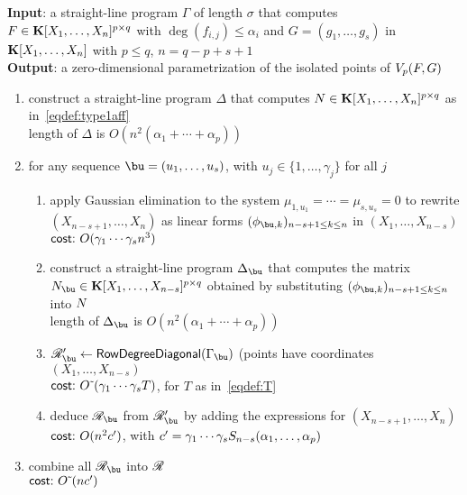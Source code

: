 \documentclass[12pt]{article}
\begin{document}
\begin{algorithm}[!t]
\caption{$\mathsf{RowDegree}(\Gamma)$}
{\bf Input}:  a straight-line program $\Gamma$ of length $\sigma$ that computes
 $F \in \mathbf{K}[X_1, \ldots, X_n]^{p \times q}$ with $\deg(f_{i,j}) \leq \alpha_i$
and $G = (g_1, \ldots, g_s)$ in $\mathbf{K}[X_1, \ldots, X_n]$ with $p \leq q$, $n = q-p+s+1$\\
{\bf Output}: a zero-dimensional parametrization of the isolated points of $V_{p}({F},G)$
\begin{enumerate}
\item construct a straight-line program $\Delta$ that computes ${N} \in \mathbf{K}[X_1,\dots,X_n]^{p \times q}$ as in~\eqref{eqdef:type1aff}\\
length of $\Delta$ is $O(n^2(\alpha_1+\cdots+\alpha_p))$
\item for any sequence $\bu=(u_1,\dots,u_s)$, with $u_j \in \{1,\dots,\gamma_j\}$ for all $j$
\begin{enumerate}
\item apply Gaussian elimination to the system $\mu_{1,u_1}=\cdots=\mu_{s,u_s}=0$
  to rewrite $(X_{n-s+1}, \ldots, X_n)$ as linear forms $(\phi_{\bu,k})_{n-s+1 \le k \le n}$ in $(X_1,\dots,X_{n-s})$\\
  $\text{\sf{cost:~}} O(\gamma_1 \cdots \gamma_s n^3)$

\item construct a straight-line program $\Delta_{\bu}$ that computes the matrix 
  $\mN_\bu  \in \KK[X_1, \dots, X_{n-s}]^{p \times q}$ obtained
  by substituting $(\phi_{\bu,k})_{n-s+1 \le k \le n}$ into ${N}$ \\
  length of $\Delta_{\bu}$ is $O(n^2(\alpha_1+\cdots+\alpha_p))$

\item $\scrR'_\bu \gets \mathsf{RowDegreeDiagonal}(\Gamma_\bu)$ (points have coordinates $(X_1,\dots,X_{n-s})$\\
  $\text{\sf{cost:~}} {O}{\,\tilde{ }\,}(\gamma_1 \cdots \gamma_s T)$, for $T$ as in~\eqref{eqdef:T}

\item deduce $\scrR_\bu$ from $\scrR'_\bu$ by adding the expressions for $(X_{n-s+1},\dots,X_n)$ \\
  $\text{\sf{cost:~}} O( n^2 {c'}{})$, with ${c'}{}= \gamma_1 \cdots \gamma_s S_{n-s}(\alpha_1,\dots,\alpha_p)$


\end{enumerate}
\item combine all $\scrR_\bu$ into $\mathscr{R}$\\
  $\text{\sf{cost:~}} {O}{\,\tilde{ }\,}(n {c'}{})$


\end{enumerate}
\end{algorithm}
\end{document}
